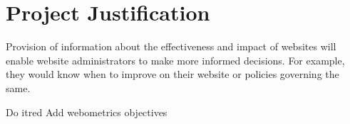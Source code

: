 \section{Project Justification}
Provision of information about the effectiveness and impact of websites will enable website administrators to make more informed decisions. For example, they would know when to improve on their website or policies governing the same.
\begin{review_comment}{Do it}{red}
{Add webometrics objectives}
\end{review_comment}

